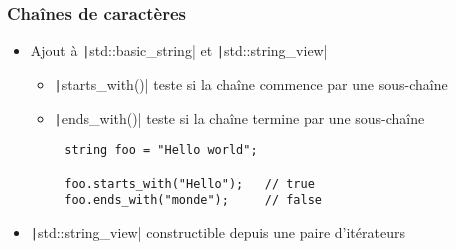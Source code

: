 \documentclass[C++.tex]{subfiles}
\begin{document}
\begin{frame}[fragile]
	\frametitle{Chaînes de caractères}
	\begin{itemize}
		\item Ajout à \texttt|std::basic_string| et \texttt|std::string_view|
		\begin{itemize}
			\item \texttt|starts_with()| teste si la chaîne commence par une sous-chaîne
			\item \texttt|ends_with()| teste si la chaîne termine par une sous-chaîne
		\end{itemize}
	\end{itemize}

	\begin{verbatim}
		string foo = "Hello world";

		foo.starts_with("Hello");   // true
		foo.ends_with("monde");     // false
	\end{verbatim}

	\begin{itemize}
		\item \texttt|std::string_view| constructible depuis une paire d'itérateurs
	\end{itemize}


\end{frame}
\end{document}
